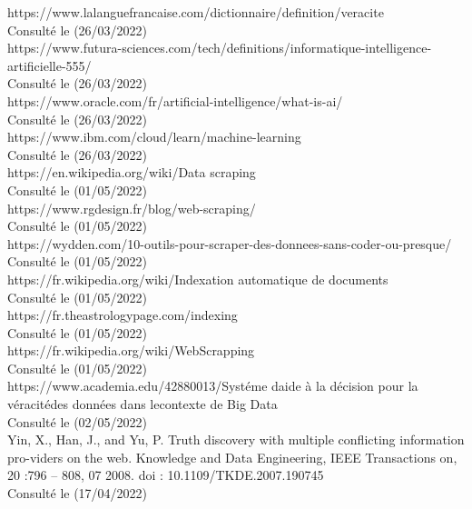 \documentclass[12pt]{report}
\begin{document}
\begin{thebibliography}{99}
 https://www.lalanguefrancaise.com/dictionnaire/definition/veracite
			\\Consulté le (26/03/2022)\\


 https://www.futura-sciences.com/tech/definitions/informatique-intelligence-artificielle-555/
			\\Consulté le (26/03/2022)\\

 https://www.oracle.com/fr/artificial-intelligence/what-is-ai/
			\\Consulté le (26/03/2022)\\
	

 https://www.ibm.com/cloud/learn/machine-learning
			\\Consulté le (26/03/2022)\\


 https://en.wikipedia.org/wiki/Data scraping
			\\Consulté le (01/05/2022)\\


 https://www.rgdesign.fr/blog/web-scraping/
			\\Consulté le (01/05/2022)\\


 https://wydden.com/10-outils-pour-scraper-des-donnees-sans-coder-ou-presque/
			\\Consulté le (01/05/2022)\\
			
 https://fr.wikipedia.org/wiki/Indexation automatique de documents
			\\Consulté le (01/05/2022)\\

 https://fr.theastrologypage.com/indexing
			\\Consulté le (01/05/2022)\\


 https://fr.wikipedia.org/wiki/WebScrapping
			\\Consulté le (01/05/2022)\\

 https://www.academia.edu/42880013/Systéme daide à la décision pour la véracitédes données dans lecontexte de Big Data
			\\Consulté le (02/05/2022)\\

 Yin, X., Han, J., and Yu, P. Truth discovery with multiple conflicting information pro-viders on the web. Knowledge and Data Engineering, IEEE Transactions on, 20 :796 – 808,
07 2008. doi : 10.1109/TKDE.2007.190745
		\\Consulté le (17/04/2022)\\


\end{thebibliography}
\end{document}
